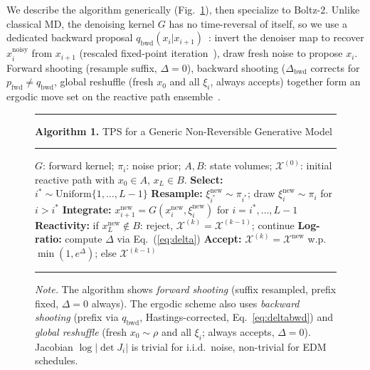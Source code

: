 \documentclass[aps,prl,twocolumn,superscriptaddress,floatfix]{revtex4-2}
\begin{document}
We describe the algorithm generically (Fig.~\ref{alg:tps}), then specialize
to Boltz-2.  Unlike classical MD, the denoising kernel $G$ has no
time-reversal of itself, so we use a dedicated backward proposal
$q_{\mathrm{bwd}}(x_i|x_{i+1})$~\cite{buijsman2020}: invert the denoiser
map to recover $x_i^{\mathrm{noisy}}$ from $x_{i+1}$ (rescaled fixed-point
iteration~\cite{boltz2_tps_theory}), draw fresh noise to propose $x_i$.
Forward shooting (resample suffix, $\Delta=0$), backward shooting
($\Delta_{\mathrm{bwd}}$ corrects for $p_{\mathrm{fwd}}\neq q_{\mathrm{bwd}}$,
global reshuffle (fresh $x_0$ and all $\xi_i$, always accepts) together form
an ergodic move set on the reactive path
ensemble~\cite{falkner2024,buijsman2020}.

\begin{figure}[t]
\hrule\vspace{2pt}
{\footnotesize\textbf{Algorithm 1.} TPS for a Generic Non-Reversible Generative Model}
\vspace{1pt}\hrule\vspace{3pt}
\begin{algorithmic}[1]
\footnotesize
\Require $G$: forward kernel; $\pi_i$: noise prior; $A,B$: state volumes;
         $\mathcal{X}^{(0)}$: initial reactive path with $x_0\!\in\!A$, $x_L\!\in\!B$.
  \State \textbf{Select:} $i^* \sim \mathrm{Uniform}\{1,\ldots,L\!-\!1\}$
  \State \textbf{Resample:} $\xi_{i^*}^{\mathrm{new}} \sim \pi_{i^*}$;\; draw $\xi_i^{\mathrm{new}}\!\sim\!\pi_i$ for $i>i^*$
  \State \textbf{Integrate:} $x_{i+1}^{\mathrm{new}} = G(x_i^{\mathrm{new}}, \xi_i^{\mathrm{new}})$\; for $i=i^*,\ldots,L\!-\!1$
  \State \textbf{Reactivity:} if $x_L^{\mathrm{new}}\!\notin\!B$: reject, $\mathcal{X}^{(k)}\!=\!\mathcal{X}^{(k-1)}$; continue
  \State \textbf{Log-ratio:} compute $\Delta$ via Eq.~(\ref{eq:delta})
  \State \textbf{Accept:} $\mathcal{X}^{(k)}\!=\!\mathcal{X}^{\mathrm{new}}$ w.p.\ $\min(1,e^{\Delta})$; else $\mathcal{X}^{(k-1)}$
\EndFor
\end{algorithmic}
\vspace{1pt}\hrule\vspace{2pt}
{\footnotesize\textit{Note.}  The algorithm shows \emph{forward shooting} (suffix resampled,
prefix fixed, $\Delta = 0$ always).  The ergodic scheme also uses
\emph{backward shooting} (prefix via $q_{\mathrm{bwd}}$, Hastings-corrected,
Eq.~\ref{eq:deltabwd}) and \emph{global reshuffle} (fresh $x_0 \sim \rho$
and all $\xi_i$; always accepts, $\Delta = 0$).
Jacobian $\log|\det J_i|$ is trivial for i.i.d.\ noise, non-trivial for
EDM schedules.}
\vspace{1pt}
\label{alg:tps}
\end{figure}
\end{document}
